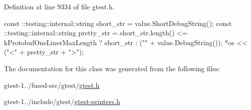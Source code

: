 \-Definition at line 9334 of file gtest.\-h.


\begin{DoxyCode}
                                                         {
    const ::testing::internal::string short_str = value.ShortDebugString();
    const ::testing::internal::string pretty_str =
        short_str.length() <= kProtobufOneLinerMaxLength ?
        short_str : ("\n" + value.DebugString());
    *os << ("<" + pretty_str + ">");
  }
\end{DoxyCode}


\-The documentation for this class was generated from the following files\-:\begin{DoxyCompactItemize}
\item 
gtest-\/1../fused-\/src/gtest/\hyperlink{fused-src_2gtest_2gtest_8h}{gtest.\-h}\item 
gtest-\/1../include/gtest/\hyperlink{gtest-printers_8h}{gtest-\/printers.\-h}\end{DoxyCompactItemize}

